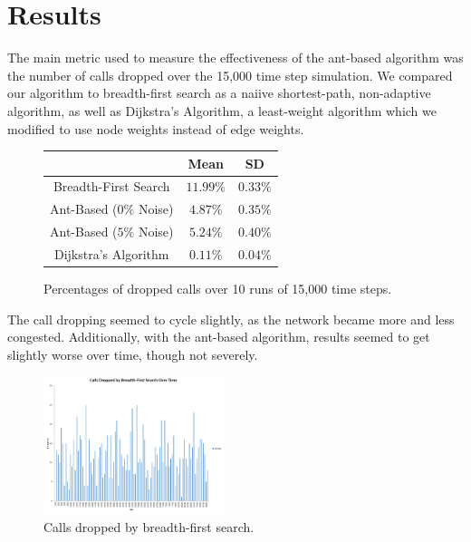 
\section{Results}
\label{sec:results}

The main metric used to measure the effectiveness of the ant-based algorithm was the number of calls dropped over the 15,000 time step simulation. We compared our algorithm to breadth-first search as a naiive shortest-path, non-adaptive algorithm, as well as Dijkstra's Algorithm, a least-weight algorithm which we modified to use node weights instead of edge weights.\\

\begin{figure}[htb]
  \centering
  \begin{tabular}{|c|c|c|} 
     \hline %
     & Mean & SD \\ 
    \hline %
    Breadth-First Search & $11.99\%$ & $0.33\%$ \\
    Ant-Based ($0\%$ Noise) & $4.87\%$ & $0.35\%$\\
    Ant-Based ($5\%$ Noise) & $5.24\%$ & $0.40\%$\\
    Dijkstra's Algorithm & $0.11\%$ & $0.04\%$\\
    \hline
  \end{tabular}
  \caption{Percentages of dropped calls over 10 runs of 15,000 time steps.}
  \label{tab:results}

\end{figure}

The call dropping seemed to cycle slightly, as the network became more and less congested. Additionally, with the ant-based algorithm, results seemed to get slightly worse over time, though not severely. 

\begin{figure}[htb]

  \centering
  \includegraphics[width=0.47\textwidth]{figs/bfs_hist.jpg}
  \caption{Calls dropped by breadth-first search.}
  \label{fig:bfs_hist}

\end{figure}

